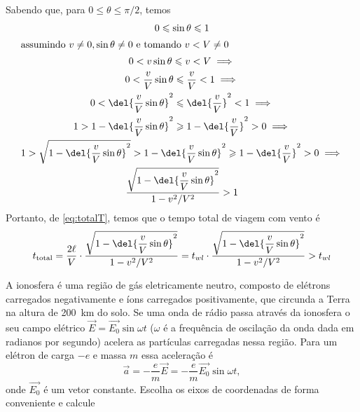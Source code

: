 \documentclass[]{IMTexam}
\begin{document}
\begin{questions}
\begin{parts}
\begin{solution}
			Sabendo que, para $ 0\leqslant\theta\leqslant\pi/2 $, temos
			\begin{gather*}
				0\leqslant\sin\theta\leqslant 1\\
				\intertext{assumindo $ v\neq 0,\sin\theta\neq 0 $ e tomando $ v<V\neq 0 $}
				0< v\sin\theta\leqslant v<V\implies\\
				0< \dfrac{v}{V}\sin\theta\leqslant\dfrac{v}{V}<1\implies\\
				0< \del{\dfrac{v}{V}\sin\theta}^{2}\leqslant\del{\dfrac{v}{V}}^{2}<1\implies\\
				1> 1-\del{\dfrac{v}{V}\sin\theta}^{2}\geqslant 1-\del{\dfrac{v}{V}}^{2}>0\implies\\
				1>\sqrt{1-\del{\dfrac{v}{V}\sin\theta}^{2}}>1-\del{\dfrac{v}{V}\sin\theta}^{2}\geqslant 1-\del{\dfrac{v}{V}}^{2}>0\implies\\
				\dfrac{\sqrt{1-\del{\dfrac{v}{V}\sin\theta}^{2}}}{1-v^{2}/V^{2}}>1
			\end{gather*}
			Portanto, de \ref{eq:totalT}, temos que o tempo total de viagem com vento é \[ t_{\text{total}}=\dfrac{2\ell}{V}\cdot\dfrac{\sqrt{1-\del{\dfrac{v}{V}\sin\theta}^{2}}}{1-v^{2}/V^{2}}=t_{wl}\cdot\dfrac{\sqrt{1-\del{\dfrac{v}{V}\sin\theta}^{2}}}{1-v^{2}/V^{2}}>t_{wl} \]
		\end{solution}

	\end{parts}

	\question
	A ionosfera é uma região de gás eletricamente neutro, composto de elétrons carregados negativamente e íons carregados positivamente, que circunda a Terra na altura de \SI{200}{\kilo\meter} do solo. Se uma onda de rádio passa através da ionosfera o seu campo elétrico $ \vec{E} = \vec{E_0} \sin \omega t $ ($\omega$ é a frequência de oscilação da onda dada em radianos por segundo) acelera as partículas carregadas nessa região. Para um elétron de carga $ -e $ e massa $ m $ essa aceleração é
	\[ \vec{a} = -\dfrac{e}{m} \vec{E} = -\dfrac{e}{m} \vec{E_0} \sin \omega t, \]
	onde $ \vec{E_0} $ é um vetor constante. Escolha os eixos de coordenadas de forma conveniente e calcule

\end{questions}
\end{document}
